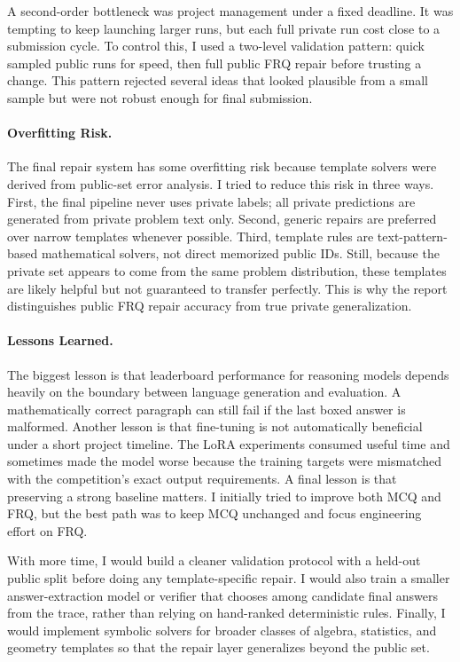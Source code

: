 \documentclass{article}
\begin{document}
A second-order bottleneck was project management under a fixed deadline. It was tempting to keep launching larger runs, but each full private run cost close to a submission cycle. To control this, I used a two-level validation pattern: quick sampled public runs for speed, then full public FRQ repair before trusting a change. This pattern rejected several ideas that looked plausible from a small sample but were not robust enough for final submission.

\paragraph{Overfitting Risk.}
The final repair system has some overfitting risk because template solvers were derived from public-set error analysis. I tried to reduce this risk in three ways. First, the final pipeline never uses private labels; all private predictions are generated from private problem text only. Second, generic repairs are preferred over narrow templates whenever possible. Third, template rules are text-pattern-based mathematical solvers, not direct memorized public IDs. Still, because the private set appears to come from the same problem distribution, these templates are likely helpful but not guaranteed to transfer perfectly. This is why the report distinguishes public FRQ repair accuracy from true private generalization.

\paragraph{Lessons Learned.}
The biggest lesson is that leaderboard performance for reasoning models depends heavily on the boundary between language generation and evaluation. A mathematically correct paragraph can still fail if the last boxed answer is malformed. Another lesson is that fine-tuning is not automatically beneficial under a short project timeline. The LoRA experiments consumed useful time and sometimes made the model worse because the training targets were mismatched with the competition's exact output requirements. A final lesson is that preserving a strong baseline matters. I initially tried to improve both MCQ and FRQ, but the best path was to keep MCQ unchanged and focus engineering effort on FRQ.

With more time, I would build a cleaner validation protocol with a held-out public split before doing any template-specific repair. I would also train a smaller answer-extraction model or verifier that chooses among candidate final answers from the trace, rather than relying on hand-ranked deterministic rules. Finally, I would implement symbolic solvers for broader classes of algebra, statistics, and geometry templates so that the repair layer generalizes beyond the public set.
\end{document}
